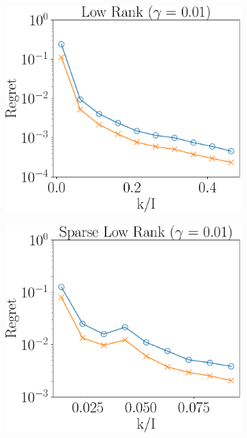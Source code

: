 \begin{figure}
	\centering
	\begin{subfigure}{0.3\textwidth}
		\includegraphics[scale = 0.24]{figure/fig3_lk_lnoise_400.pdf}
	\end{subfigure}
	\begin{subfigure}{0.3\textwidth}
		\includegraphics[scale = 0.24]{figure/fig3_slk_lnoise_400.pdf}
	\end{subfigure}

\end{figure}
